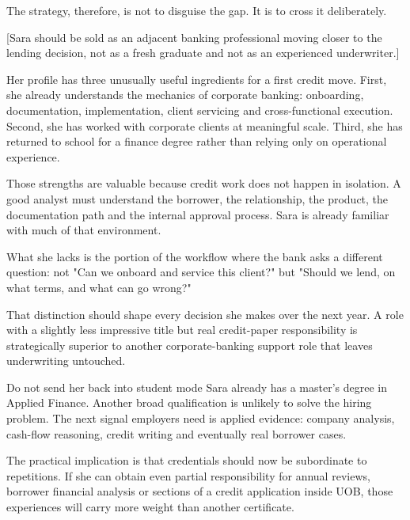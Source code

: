 \documentclass[theme=editorial,publication-type=feature-article]{reportkit}
\begin{document}
The strategy, therefore, is not to disguise the gap. It is to cross it deliberately.

[Sara should be sold as an adjacent banking professional moving closer to the lending decision, not as a fresh graduate and not as an experienced underwriter.]

\begin{featurecolumns}
Her profile has three unusually useful ingredients for a first credit move. First, she already understands the mechanics of corporate banking: onboarding, documentation, implementation, client servicing and cross-functional execution. Second, she has worked with corporate clients at meaningful scale. Third, she has returned to school for a finance degree rather than relying only on operational experience.

Those strengths are valuable because credit work does not happen in isolation. A good analyst must understand the borrower, the relationship, the product, the documentation path and the internal approval process. Sara is already familiar with much of that environment.

What she lacks is the portion of the workflow where the bank asks a different question: not "Can we onboard and service this client?" but "Should we lend, on what terms, and what can go wrong?"


That distinction should shape every decision she makes over the next year. A role with a slightly less impressive title but real credit-paper responsibility is strategically superior to another corporate-banking support role that leaves underwriting untouched.

\begin{featuresidebar}{Do not send her back into student mode}
Sara already has a master's degree in Applied Finance. Another broad qualification is unlikely to solve the hiring problem. The next signal employers need is applied evidence: company analysis, cash-flow reasoning, credit writing and eventually real borrower cases.
\end{featuresidebar}

The practical implication is that credentials should now be subordinate to repetitions. If she can obtain even partial responsibility for annual reviews, borrower financial analysis or sections of a credit application inside UOB, those experiences will carry more weight than another certificate.
\end{featurecolumns}
\end{document}
